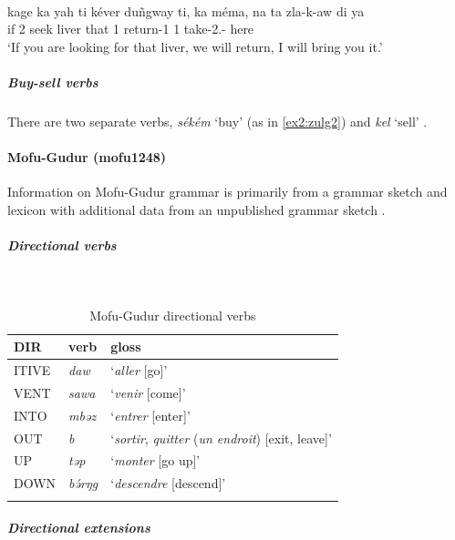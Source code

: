 \ea\label{ex2:zulg9}
 \\
\gll kage ka yah ti kéver duñgway ti, ka méma, na ta zla-k-aw di ya \\
if 2 seek  liver that  1 return-1 1  take-2.-  here	\\
\glt `If you are looking for that liver, we will return, I will bring you it.'
\z 

\subparagraph{Buy-sell verbs}

There are two separate verbs, \textit{sékém} `buy' (as in \ref{ex2:zulg2}) and \textit{kel} `sell' \citep[50]{hallerVerbalComplexZulgo1981}.

\paragraph*{Mofu-Gudur (mofu1248)} \label{mofu}

Information on Mofu-Gudur grammar is primarily from a grammar sketch and lexicon \citep{barreteauDescriptionMofuGudurLangue1983} with additional data from an unpublished grammar sketch \citep{hollingsworthTransitivityPragmaticsObject1995}. 

\subparagraph{Directional verbs}~

\begin{table}[H]
	\caption{Mofu-Gudur directional verbs} 
	\label{tab:mofuV}
	\begin{tabular}{lll} %
		\lsptoprule
		DIR & verb & gloss   \\ %
		\midrule
		ITIVE & \textit{daw} & `\textit{aller} [go]' \\
		VENT & \textit{sawa} & `\textit{venir} [come]' \\
		INTO& \textit{mbəz} & `\textit{entrer} [enter]' \\
		OUT & \textit{b} & `\textit{sortir}, \textit{quitter} (\textit{un endroit}) [exit, leave]' \\
		UP & \textit{təp} & `\textit{monter} [go up]' \\ 
		DOWN & \textit{bə́rŋg} & `\textit{descendre} [descend]' \\
		\lspbottomrule
	\end{tabular}
\end{table}

\subparagraph{Directional extensions}~

